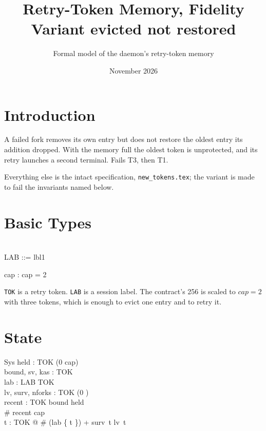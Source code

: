 \documentclass[a4paper,10pt,fleqn]{article}
\begin{document}
\title{Retry-Token Memory, Fidelity Variant evicted not restored}
\author{Formal model of the daemon's retry-token memory}
\date{November 2026}
\maketitle

\section{Introduction}

A failed fork removes its own entry but does not restore the oldest entry its addition dropped. With the memory full the oldest token is unprotected, and its retry launches a second terminal. Fails T3, then T1.

Everything else is the intact specification, \texttt{new\_tokens.tex}; the variant is made to fail the invariants named below.

\section{Basic Types}

\begin{zed}
  [TOK] \\
  LAB ::= lbl1
\end{zed}

\begin{axdef}
  cap : \nat
\where
  cap = 2
\end{axdef}

\texttt{TOK} is a retry token.  \texttt{LAB} is a session label.  The
contract's 256 is scaled to $cap = 2$ with three tokens, which is enough to
evict one entry and to retry it.

\section{State}

\begin{schema}{Sys}
  held : TOK \pfun (0 \upto cap) \\
  bound, sv, kas : \power TOK \\
  lab : LAB \pfun TOK \\
  lv, surv, nforks : TOK \fun (0 ) \\
  recent : \seq TOK
\where
  bound \subseteq \dom held \\
  \# recent \leq cap \\
  \forall t : TOK @ \# (lab \rres \{ t \}) + surv~t \leq lv~t
\end{schema}
\end{document}
